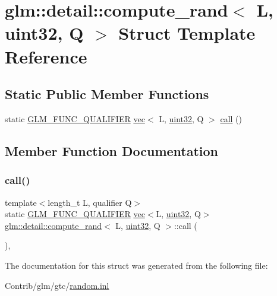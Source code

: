 \hypertarget{structglm_1_1detail_1_1compute__rand_3_01_l_00_01uint32_00_01_q_01_4}{}\section{glm\+:\+:detail\+:\+:compute\+\_\+rand$<$ L, uint32, Q $>$ Struct Template Reference}
\label{structglm_1_1detail_1_1compute__rand_3_01_l_00_01uint32_00_01_q_01_4}
\subsection*{Static Public Member Functions}
\begin{DoxyCompactItemize}
\item 
static \mbox{\hyperlink{setup_8hpp_a33fdea6f91c5f834105f7415e2a64407}{G\+L\+M\+\_\+\+F\+U\+N\+C\+\_\+\+Q\+U\+A\+L\+I\+F\+I\+ER}} \mbox{\hyperlink{structglm_1_1vec}{vec}}$<$ L, \mbox{\hyperlink{namespaceglm_1_1detail_ade6cfbf377022aaa391af8cd50489222}{uint32}}, Q $>$ \mbox{\hyperlink{structglm_1_1detail_1_1compute__rand_3_01_l_00_01uint32_00_01_q_01_4_a3f7bf8e5c44f275c59678a82cc6087ea}{call}} ()
\end{DoxyCompactItemize}


\subsection{Member Function Documentation}
\mbox{\label{structglm_1_1detail_1_1compute__rand_3_01_l_00_01uint32_00_01_q_01_4_a3f7bf8e5c44f275c59678a82cc6087ea}} 
\subsubsection{\texorpdfstring{call()}{call()}}
{\footnotesize\ttfamily template$<$length\+\_\+t L, qualifier Q$>$ \\
static \mbox{\hyperlink{setup_8hpp_a33fdea6f91c5f834105f7415e2a64407}{G\+L\+M\+\_\+\+F\+U\+N\+C\+\_\+\+Q\+U\+A\+L\+I\+F\+I\+ER}} \mbox{\hyperlink{structglm_1_1vec}{vec}}$<$L, \mbox{\hyperlink{namespaceglm_1_1detail_ade6cfbf377022aaa391af8cd50489222}{uint32}}, Q$>$ \mbox{\hyperlink{structglm_1_1detail_1_1compute__rand}{glm\+::detail\+::compute\+\_\+rand}}$<$ L, \mbox{\hyperlink{namespaceglm_1_1detail_ade6cfbf377022aaa391af8cd50489222}{uint32}}, Q $>$\+::call (\begin{DoxyParamCaption}{ }\end{DoxyParamCaption})\hspace{0.3cm}{\ttfamily [inline]}, {\ttfamily [static]}}



The documentation for this struct was generated from the following file\+:\begin{DoxyCompactItemize}
\item 
Contrib/glm/gtc/\mbox{\hyperlink{random_8inl}{random.\+inl}}\end{DoxyCompactItemize}
